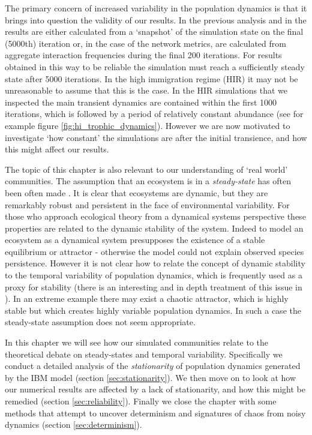 The primary concern of increased variability in the population dynamics is that it brings into question the validity of our results. In the previous analysis and in \cite{lurgi2015effects} the results are either calculated from a `snapshot' of the simulation state on the final (5000th) iteration or, in the case of the network metrics, are calculated from aggregate interaction frequencies during the final 200 iterations. For results obtained in this way to be reliable the simulation must reach a sufficiently steady state after 5000 iterations. In the high immigration regime (HIR) it may not be unreasonable to assume that this is the case. In the HIR simulations that we inspected the main transient dynamics are contained within the first 1000 iterations, which is followed by a period of relatively constant abundance (see for example figure \ref{fig:hi_trophic_dynamics}). However we are now motivated to investigate `how constant' the simulations are after the initial transience, and how this might affect our results.  

The topic of this chapter is also relevant to our understanding of `real world' communities. The assumption that an ecosystem is in a \emph{steady-state} has often been often made \cite{brock1967ecosystem}. It is clear that ecosystems are dynamic, but they are remarkably robust and persistent in the face of environmental variability. For those who approach ecological theory from a dynamical systems perspective these properties are related to the dynamic stability of the system. Indeed to model an ecosystem as a dynamical system presupposes the existence of a stable equilibrium or attractor - otherwise the model could not explain observed species persistence. However it is not clear how to relate the concept of dynamic stability to the temporal variability of population dynamics, which is frequently used as a proxy for stability (there is an interesting and in depth treatment of this issue in \cite{arnoldi2015}). In an extreme example there may exist a chaotic attractor, which is highly stable but which creates highly variable population dynamics. In such a case the steady-state assumption does not seem appropriate. 

In this chapter we will see how our simulated communities relate to the theoretical debate on steady-states and temporal variability. Specifically we conduct a detailed analysis of the \emph{stationarity} of population dynamics generated by the IBM model (section \ref{sec:stationarity}). We then move on to look at how our numerical results are affected by a lack of stationarity, and how this might be remedied (section \ref{sec:reliability}). Finally we close the chapter with some methods that attempt to uncover determinism and signatures of chaos from noisy dynamics (section \ref{sec:determinism}).

